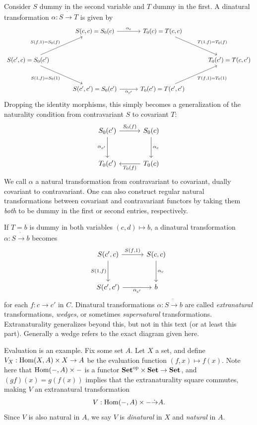 Consider $S$ dummy in the second variable and $T$ dummy in the first. A dinatural transformation $\alpha : S \dot{\to } T$ is given by
\[\begin{tikzcd}[row sep = 3em, column sep = 3em]
 & S(c,c)=S_0(c)\ar[" \alpha_c ", r]  & T_0(c)=T(c,c)\ar[" T(1\text{,} f)=T_0(f) ", dr]  &  \\
S(c',c)=S_0(c')\ar[" S(f\text{,} 1)=S_0(f) ", ur] \ar[" S(1\text{,} f)=S_0(1) "', dr]  &  &  & T_0(c')=T(c,c') \\
 & S(c',c')=S_0(c')\ar[" \alpha_{c'}  "', r]  & T_0(c')=T(c',c')\ar[" T(f\text{,} 1)=T_0(1) "', ur]  & 
\end{tikzcd}\]
Dropping the identity morphisms, this simply becomes a generalization of the naturality condition from contravariant $S$ to covariant $T$:
\[\begin{tikzcd}[row sep = 3em, column sep = 3em]
S_0(c')\ar[" S_0(f) ", r] \ar[" \alpha_{c'}  "', d]  & S_0(c)\ar[" \alpha_c ", d]  \\
T_0(c') & T_0(c)\ar[" T_0(f) ", l] 
\end{tikzcd}\]
We call $\alpha$ a natural transformation from contravariant to covariant, dually covariant to contravariant. One can also construct regular natural transformations between covariant and contravariant functors by taking them \emph{both} to be dummy in the first or second entries, respectively.

If $T=b$ is dummy in both variables $(c,d)\mapsto b$, a dinatural transformation $\alpha : S \dot{\to} b$ becomes
\[\begin{tikzcd}[row sep = 3em, column sep = 3em]
S(c',c)\ar[" S(f\text{,} 1) ", r] \ar[" S(1\text{,} f) "', d]  & S(c,c)\ar[" \alpha_c ", d]  \\
S(c',c')\ar[" \alpha_{c'}  "', r]  & b
\end{tikzcd}\]
for each $f : c \to c'$ in $C$. Dinatural transformations $\alpha : S \dot{\to } b$ are called \emph{extranatural} transformations, \emph{wedges}, or sometimes \emph{supernatural} transformations. Extranaturality generalizes beyond this, but not in this text (or at least this part). Generally a wedge refers to the exact diagram given here.

Evaluation is an example. Fix some set $A$. Let $X$ a set, and define $V_X : \operatorname{Hom}(X, A) \times X \to A$ be the evaluation function $(f,x)\mapsto f(x)$. Note here that $\operatorname{Hom}(-, A) \times -$ is a functor $\mathbf{Set} ^{\mathrm{op} } \times \mathbf{Set} \to \mathbf{Set} $, and $(gf)(x)=g(f(x))$ implies that the extranaturality square commutes, making $V$ an extranatural transformation
\[
	V : \operatorname{Hom}(-, A) \times - \dot{\to } A
.\]
Since $V$ is also natural in $A$, we say $V$ is \emph{dinatural} in $X$ and \emph{natural} in $A$.

